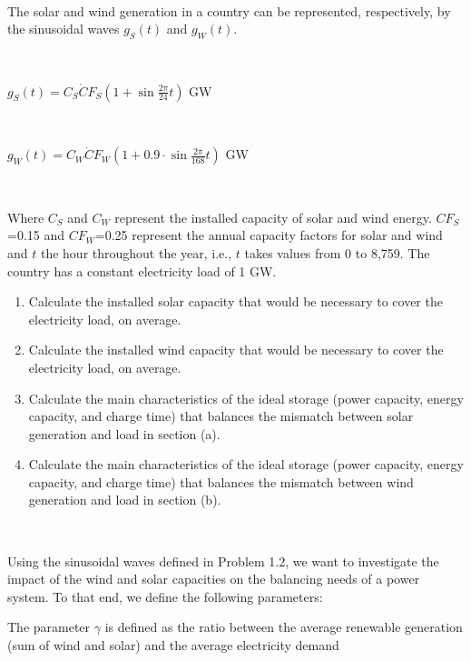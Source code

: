 \documentclass[10pt]{article}
\newenvironment{problem}[2][Problem]{\begin{trivlist}
\item[\hskip \labelsep {\bfseries #1}\hskip \labelsep {\bfseries #2.}]}{\end{trivlist}}
\begin{document}
\

\begin{problem}{1.2.}
The solar and wind generation in a country can be represented, respectively, by the sinusoidal waves $g_S(t)$ and $g_W(t)$. 

\

$g_S(t)=C_S \dot CF_S (1+\sin{\frac{2\pi}{24} t})$  GW

\

$g_W (t)=C_W \dot CF_W (1+0.9·\sin{\frac{2\pi}{168} t})$  GW

\

Where $C_S$ and $C_W$ represent the installed capacity of solar and wind energy. $CF_S$=0.15 and $CF_W$=0.25 represent the annual capacity factors for solar and wind and $t$ the hour throughout the year, i.e., $t$ takes values from 0 to 8,759. The country has a constant electricity load of 1 GW.

\begin{enumerate}
\item[a)] Calculate the installed solar capacity that would be necessary to cover the electricity load, on average.  
\item[b)] Calculate the installed wind capacity that would be necessary to cover the electricity load, on average.  
\item[c)] Calculate the main characteristics of the ideal storage (power capacity, energy capacity, and charge time) that balances the mismatch between solar generation and load in section (a).
\item[d)] Calculate the main characteristics of the ideal storage (power capacity, energy capacity, and charge time) that balances the mismatch between wind generation and load in section (b).

\end{enumerate}

\end{problem}

\

\begin{problem}{1.3}

\end{problem}
Using the sinusoidal waves defined in Problem 1.2, we want to investigate the impact of the wind and solar capacities on the balancing needs of a power system. To that end, we define the following parameters:

The parameter $\gamma$ is defined as the ratio between the average renewable generation (sum of wind and solar) and the average electricity demand 
\end{document}

